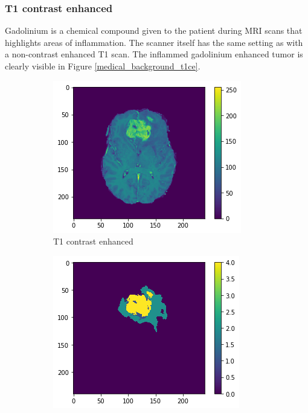 \subsubsection{T1 contrast enhanced}
Gadolinium is a chemical compound given to the patient during MRI scans that highlights areas of inflammation.
The scanner itself has the same setting as with a non-contrast enhanced T1 scan. The inflammed gadolinium enhanced tumor is clearly visible in Figure \ref{medical_background_t1ce}.

\begin{figure}[H]
    \centering
    \begin{subfigure}{.5\textwidth}
        \centering
        \includegraphics[width=\linewidth]{chapters/04_segmentation/images/medical_background/t1ce.png}
        \caption{T1 contrast enhanced}
    \end{subfigure}%
    \begin{subfigure}{.5\textwidth}
        \centering
        \includegraphics[width=\linewidth]{chapters/04_segmentation/images/medical_background/tumor.png}

\end{subfigure}
\end{figure}
